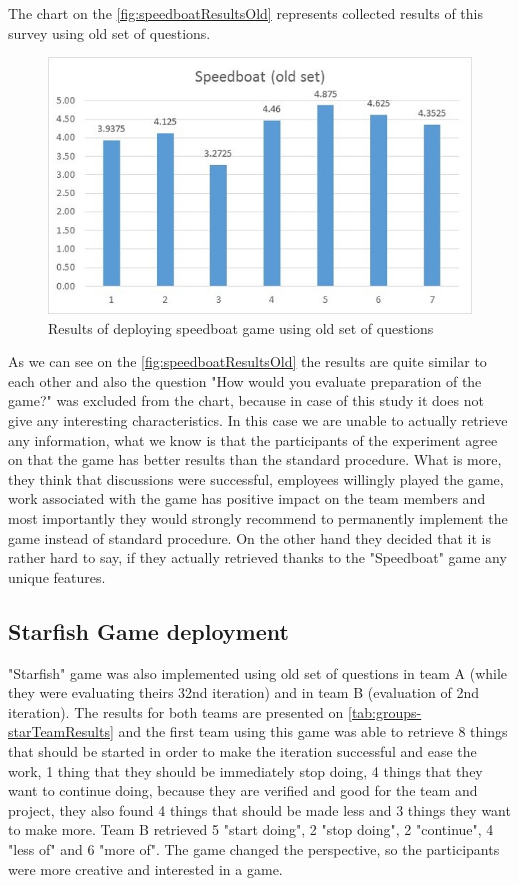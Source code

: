 The chart on the \autoref{fig:speedboatResultsOld} represents collected results of this survey using old set of questions.

\begin{figure}[!htbp]
\caption{Results of deploying speedboat game using old set of questions}
\label{fig:speedboatResultsOld}
\centering
\includegraphics[width=1\textwidth]{charts/speedboatOldSet}
\end{figure}

As we can see on the \autoref{fig:speedboatResultsOld} the results are quite similar to each other and also the question "How would you evaluate preparation of the game?" was excluded from the chart, because in case of this study it does not give any interesting characteristics. In this case we are unable to actually retrieve any information, what we know is that the participants of the experiment agree on that the game has better results than the standard procedure. What is more, they think that discussions were successful, employees willingly played the game, work associated with the game has positive impact on the team members and most importantly they would strongly recommend to permanently implement the game instead of standard procedure. On the other hand they decided that it is rather hard to say, if they actually retrieved thanks to the "Speedboat" game any unique features.

\subsection{Starfish Game deployment}

"Starfish" game was also implemented using old set of questions in team A (while they were evaluating theirs 32nd iteration) and in team B (evaluation of 2nd iteration). The results for both teams are presented on \autoref{tab:groups-starTeamResults} and the first team using this game was able to retrieve 8 things that should be started in order to make the iteration successful and ease the work, 1 thing that they should be immediately stop doing, 4 things that they want to continue doing, because they are verified and good for the team and project, they also found 4 things that should be made less and 3 things they want to make more. Team B retrieved 5 "start doing", 2 "stop doing", 2 "continue", 4 "less of" and 6 "more of". The game changed the perspective, so the participants were more creative and interested in a game.

